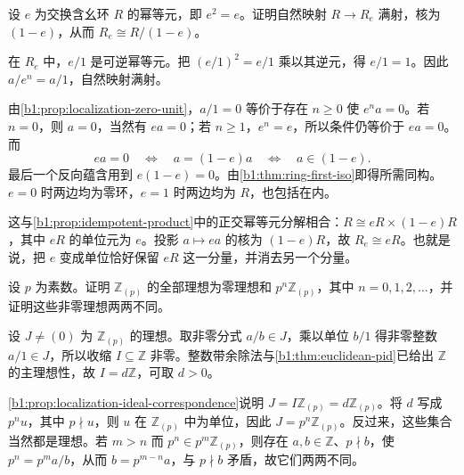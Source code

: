 \begin{exercise}\label{b1:ex:13-5}
	设 \(e\) 为交换含幺环 \(R\) 的幂等元，即 \(e^2=e\)。证明自然映射 \(R\rightarrow R_e\) 满射，核为 \((1-e)\)，从而 \(R_e\cong R/(1-e)\)。
\end{exercise}
\begin{solution}
	在 \(R_e\) 中，\(e/1\) 是可逆幂等元。把 \((e/1)^2=e/1\) 乘以其逆元，得 \(e/1=1\)。因此 \(a/e^n=a/1\)，自然映射满射。

	由\cref{b1:prop:localization-zero-unit}，\(a/1=0\) 等价于存在 \(n\geq0\) 使 \(e^na=0\)。若 \(n=0\)，则 \(a=0\)，当然有 \(ea=0\)；若 \(n\geq1\)，\(e^n=e\)，所以条件仍等价于 \(ea=0\)。而
	\[
		ea=0\quad\Longleftrightarrow\quad a=(1-e)a \quad\Longleftrightarrow\quad a\in(1-e).
	\]
	最后一个反向蕴含用到 \(e(1-e)=0\)。由\cref{b1:thm:ring-first-iso}即得所需同构。\(e=0\) 时两边均为零环，\(e=1\) 时两边均为 \(R\)，也包括在内。

	这与\cref{b1:prop:idempotent-product}中的正交幂等元分解相合：\(R\cong eR\times(1-e)R\)，其中 \(eR\) 的单位元为 \(e\)。投影 \(a\mapsto ea\) 的核为 \((1-e)R\)，故 \(R_e\cong eR\)。也就是说，把 \(e\) 变成单位恰好保留 \(eR\) 这一分量，并消去另一个分量。
\end{solution}

\begin{exercise}\label{b1:ex:13-6}
	设 \(p\) 为素数。证明 \(\mathbb Z_{(p)}\) 的全部理想为零理想和 \(p^n\mathbb Z_{(p)}\)，其中 \(n=0,1,2,\ldots\)，并证明这些非零理想两两不同。
\end{exercise}
\begin{solution}
	设 \(J\neq(0)\) 为 \(\mathbb Z_{(p)}\) 的理想。取非零分式 \(a/b\in J\)，乘以单位 \(b/1\) 得非零整数 \(a/1\in J\)，所以收缩 \(I\subseteq\mathbb Z\) 非零。整数带余除法与\cref{b1:thm:euclidean-pid}已给出 \(\mathbb Z\) 的主理想性，故 \(I=d\mathbb Z\)，可取 \(d>0\)。

	\cref{b1:prop:localization-ideal-correspondence}说明 \(J=I\mathbb Z_{(p)}=d\mathbb Z_{(p)}\)。将 \(d\) 写成 \(p^nu\)，其中 \(p\nmid u\)，则 \(u\) 在 \(\mathbb Z_{(p)}\) 中为单位，因此 \(J=p^n\mathbb Z_{(p)}\)。反过来，这些集合当然都是理想。若 \(m>n\) 而 \(p^n\in p^m\mathbb Z_{(p)}\)，则存在 \(a,b\in\mathbb Z\)、\(p\nmid b\)，使 \(p^n=p^ma/b\)，从而 \(b=p^{m-n}a\)，与 \(p\nmid b\) 矛盾，故它们两两不同。
\end{solution}

